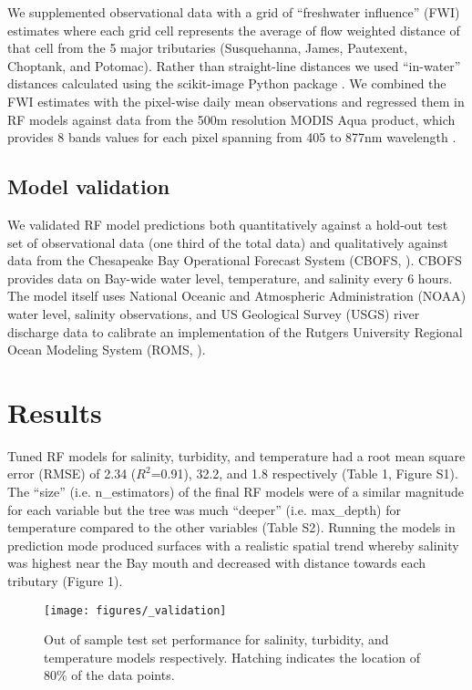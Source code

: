 \documentclass{article}
\begin{document}
We supplemented observational data with a grid of “freshwater influence” (FWI) estimates where each grid cell represents the average of flow weighted distance of that cell from the 5 major tributaries (Susquehanna, James, Pautexent, Choptank, and Potomac). Rather than straight-line distances we used “in-water” distances calculated using the scikit-image Python package \citep{vanderwaltScikitimageImageProcessing2014}. We combined the FWI estimates with the pixel-wise daily mean observations and regressed them in RF models against data from the 500m resolution MODIS Aqua product, which provides 8 bands values for each pixel spanning from 405 to 877nm wavelength \citep{vermoteericMOD09GAMODISTerra2015}.


\subsection{Model validation}

We validated RF model predictions both quantitatively against a hold-out test set of observational data (one third of the total data) and qualitatively against data from the Chesapeake Bay Operational Forecast System (CBOFS, \citet{lanerolle2011second}). CBOFS provides data on Bay-wide water level, temperature, and salinity every 6 hours. The model itself uses National Oceanic and Atmospheric Administration (NOAA) water level, salinity observations, and US Geological Survey (USGS) river discharge data to calibrate an implementation of the Rutgers University Regional Ocean Modeling System (ROMS, \citet{shchepetkinRegionalOceanicModeling2005}).


\section{Results}

Tuned RF models for salinity, turbidity, and temperature had a root mean square error (RMSE) of 2.34 ($R^2$=0.91), 32.2, and 1.8 respectively (Table 1, Figure S1). The “size” (i.e. n\_estimators) of the final RF models were of a similar magnitude for each variable but the tree was much “deeper” (i.e. max\_depth) for temperature compared to the other variables (Table S2). Running the models in prediction mode produced surfaces with a realistic spatial trend whereby salinity was highest near the Bay mouth and decreased with distance towards each tributary (Figure 1).

\begin{figure}[ht!]
    \begin{center}
          \texttt{[image: figures/\_validation]}
          \caption{Out of sample test set performance for salinity, turbidity, and temperature models respectively. Hatching indicates the location of 80\% of the data points.}
    \end{center}    
\end{figure}
\end{document}
